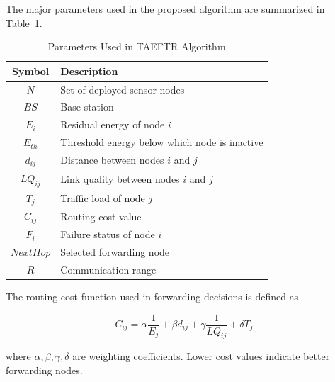 \documentclass[a4paper,fleqn]{cas-dc}
\numberwithin{equation}{section}
\begin{document}
The major parameters used in the proposed algorithm are summarized in Table~\ref{tab:params}.

\begin{table}[h]
\centering
\caption{Parameters Used in TAEFTR Algorithm}
\label{tab:params}
\renewcommand{\arraystretch}{1.2}
\begin{tabular}{|c|p{6cm}|}
\hline
\textbf{Symbol} & \textbf{Description} \\
\hline
$N$ & Set of deployed sensor nodes \\
$BS$ & Base station \\
$E_i$ & Residual energy of node $i$ \\
$E_{th}$ & Threshold energy below which node is inactive \\
$d_{ij}$ & Distance between nodes $i$ and $j$ \\
$LQ_{ij}$ & Link quality between nodes $i$ and $j$ \\
$T_j$ & Traffic load of node $j$ \\
$C_{ij}$ & Routing cost value \\
$F_i$ & Failure status of node $i$ \\
$NextHop$ & Selected forwarding node \\
$R$ & Communication range \\
\hline
\end{tabular}
\end{table}

The routing cost function used in forwarding decisions is defined as

\begin{equation}
C_{ij}=
\alpha \frac{1}{E_j}
+\beta d_{ij}
+\gamma \frac{1}{LQ_{ij}}
+\delta T_j
\end{equation}

where $\alpha,\beta,\gamma,\delta$ are weighting coefficients. Lower cost values indicate better forwarding nodes.
\end{document}
